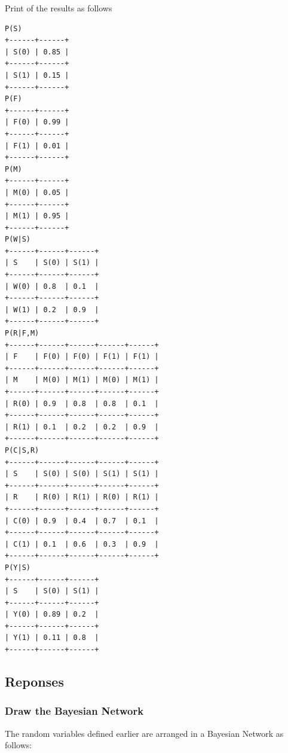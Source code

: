 \documentclass[12pt, letterpaper]{article}
\begin{document}
Print of the results as follows
\begin{mdframed}[backgroundcolor=bg]
\begin{lstlisting}
P(S)
+------+------+
| S(0) | 0.85 |
+------+------+
| S(1) | 0.15 |
+------+------+
P(F)
+------+------+
| F(0) | 0.99 |
+------+------+
| F(1) | 0.01 |
+------+------+
P(M)
+------+------+
| M(0) | 0.05 |
+------+------+
| M(1) | 0.95 |
+------+------+
P(W|S)
+------+------+------+
| S    | S(0) | S(1) |
+------+------+------+
| W(0) | 0.8  | 0.1  |
+------+------+------+
| W(1) | 0.2  | 0.9  |
+------+------+------+
P(R|F,M)
+------+------+------+------+------+
| F    | F(0) | F(0) | F(1) | F(1) |
+------+------+------+------+------+
| M    | M(0) | M(1) | M(0) | M(1) |
+------+------+------+------+------+
| R(0) | 0.9  | 0.8  | 0.8  | 0.1  |
+------+------+------+------+------+
| R(1) | 0.1  | 0.2  | 0.2  | 0.9  |
+------+------+------+------+------+
P(C|S,R)
+------+------+------+------+------+
| S    | S(0) | S(0) | S(1) | S(1) |
+------+------+------+------+------+
| R    | R(0) | R(1) | R(0) | R(1) |
+------+------+------+------+------+
| C(0) | 0.9  | 0.4  | 0.7  | 0.1  |
+------+------+------+------+------+
| C(1) | 0.1  | 0.6  | 0.3  | 0.9  |
+------+------+------+------+------+
P(Y|S)
+------+------+------+
| S    | S(0) | S(1) |
+------+------+------+
| Y(0) | 0.89 | 0.2  |
+------+------+------+
| Y(1) | 0.11 | 0.8  |
+------+------+------+
\end{lstlisting}    
\end{mdframed}

\subsection{Reponses}
\subsubsection{Draw the Bayesian Network}

The random variables defined earlier are arranged in a Bayesian Network as follows:
\begin{center}
\end{center}
\end{document}
